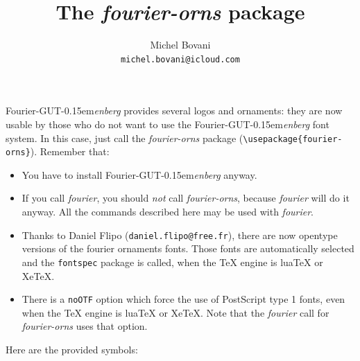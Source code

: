 \documentclass[a4paper,11pt,draft]{article}
\title{\floweroneleft{}\,The \emph{fourier-orns} package\,\floweroneright}
\author{Michel Bovani\\\texttt{michel.bovani@icloud.com}}
\newcommand{\fourier}{Fourier-GUT\kern-0.15em\textit{enberg}}
\begin{document}
\sloppy
\maketitle

\fourier{} provides several logos and ornaments: they are now usable by those who do not want to use
the \fourier{} font system. In this case, just call the \textit{fourier-orns} package (\verb=\usepackage{fourier-orns}=).
Remember that:
\begin{itemize}
\item You have to install \fourier{} anyway.
\item If you call \textit{fourier}, you should \emph{not} call \textit{fourier-orns}, because \textit{fourier} will do it anyway.
All the commands described here may be used with \textit{fourier}.
\item Thanks to Daniel Flipo (\texttt{daniel.flipo@free.fr}), there are now opentype versions of the fourier ornaments fonts. Those fonts are automatically selected and the \texttt{fontspec} package is called, when the \TeX{} engine is lua\TeX{} or Xe\TeX{}.
\item There is a \texttt{noOTF} option which force the use of PostScript type 1 fonts, even when the \TeX{} engine is lua\TeX{} or Xe\TeX{}. Note that the \textit{fourier} call for \textit{fourier-orns} uses that option.
\end{itemize}

\bigskip

Here are the provided symbols:
\end{document}
